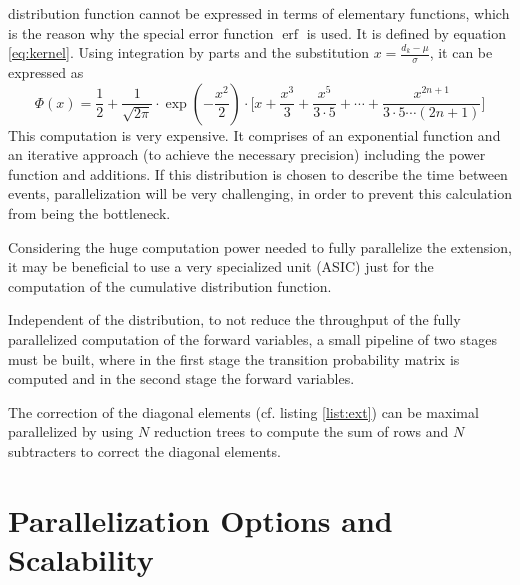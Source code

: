 \documentclass[mscthesis]{usiinfthesis}
\DeclareMathOperator{\erf}{erf}
\begin{document}
\begin{description}
        distribution function cannot be expressed in terms of elementary
        functions, which is the reason why the special error function $\erf$ is
        used. It is defined by equation \ref{eq:kernel}. Using integration by
        parts and the substitution $x = \frac{d_k-\mu}{\sigma}$, it can be
        expressed as
        \begin{equation}
            \Phi(x) = \frac{1}{2}
                + \frac{1}{\sqrt{2\pi}} \cdot \exp(-\frac{x^2}{2})
                \cdot \Bigg[ x+\frac{x^3}{3} + \frac{x^5}{3 \cdot 5} + \cdots
                + \frac{x^{2n+1}}{3 \cdot 5 \cdots (2n+1)} \Bigg]
        \end{equation}
        This computation is very expensive. It comprises of an exponential
        function and an iterative approach (to achieve the necessary precision)
        including the power function and additions. If this distribution is
        chosen to describe the time between events, parallelization will be very
        challenging, in order to prevent this calculation from being the
        bottleneck.
\end{description}

Considering the huge computation power needed to fully parallelize the
extension, it may be beneficial to use a very specialized unit (ASIC) just for
the computation of the cumulative distribution function.

Independent of the distribution, to not reduce the throughput of the fully
parallelized computation of the forward variables, a small pipeline of two
stages must be built, where in the first stage the transition probability
matrix is computed and in the second stage the forward variables.

The correction of the diagonal elements (cf. listing \ref{list:ext}) can be
maximal parallelized by using $N$ reduction trees to compute the sum of rows and
$N$ subtracters to correct the diagonal elements.

\section{Parallelization Options and Scalability}
\label{ch:analysis_all}
\end{document}

